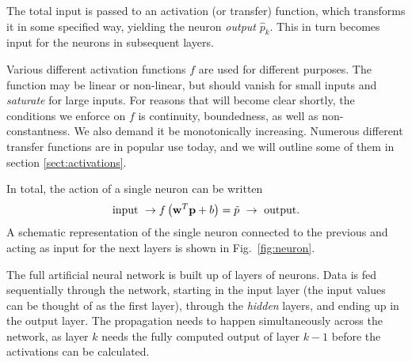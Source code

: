 \documentclass[a4paper, twocolumn]{article}
\newcommand{\fig}[1]{Fig.\ \ref{fig:#1}}
\begin{document}
The total input is passed to an activation (or transfer) function, which transforms it in some specified way, yielding the neuron \emph{output} $\hat p_k$. This in turn becomes input for the neurons in subsequent layers. 

Various different activation functions $f$ are used for different purposes. The function may be linear or non-linear, but should vanish for small inputs and \emph{saturate} for large inputs. For reasons that will become clear shortly, the conditions we enforce on $f$ is continuity, boundedness, as well as non-constantness. We also demand it be monotonically increasing. Numerous different transfer functions are in popular use today, and we will outline some of them in section \ref{sect:activations}.

In total, the action of a single neuron can be written
\begin{align}
\text{input}\ \rightarrow f\left({\bf w}^T{\bf p}+b\right) = \tilde p \ \rightarrow \ \text{output}.
\end{align}
A schematic representation of the single neuron connected to the previous and acting as input for the next layers is shown in \fig{neuron}. 

The full artificial neural network is built up of layers of neurons. Data is fed sequentially through the network, starting in the input layer (the input values can be thought of as the first layer), through the \emph{hidden} layers, and ending up in the output layer. The propagation needs to happen simultaneously across the network, as layer $k$ needs the fully computed output of layer $k-1$ before the activations can be calculated. 
\end{document}
